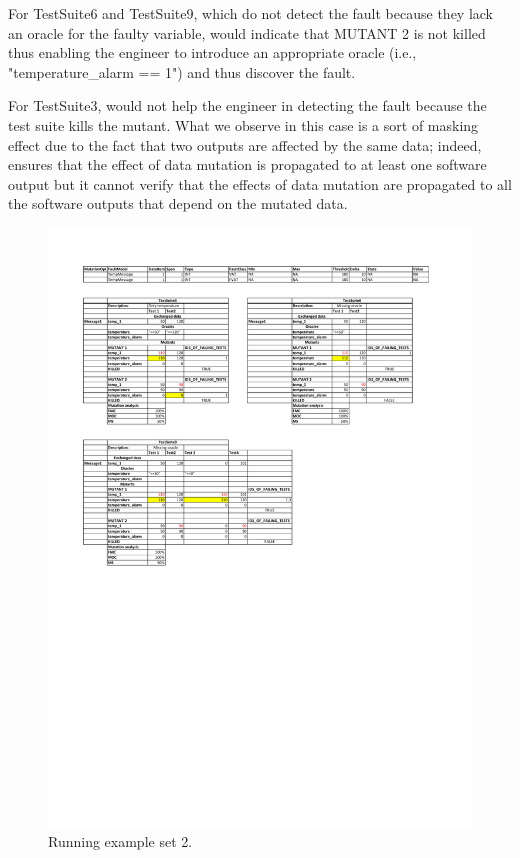 For TestSuite6 and TestSuite9, which do not detect the fault because they lack an oracle for the faulty variable, \APPR would indicate that MUTANT 2 is not killed thus enabling the engineer to introduce an appropriate oracle (i.e., "temperature\_alarm == 1") and thus discover the fault.

For TestSuite3, \APPR would not help the engineer in detecting the fault because the test suite kills the mutant. What we observe in this case is a sort of masking effect due to the fact that two outputs are affected by the same data; indeed, \APPR ensures that the effect of data mutation is propagated to at least one software output but it cannot verify that the effects of data mutation are propagated to all the software outputs that depend on the mutated data.

\begin{figure}[tb]
\centering
\includegraphics[width=14cm]{damat/DataDrivenExample2}
\caption{Running example set 2.}
\label{fig:damat:RunningExample2}
\end{figure}

